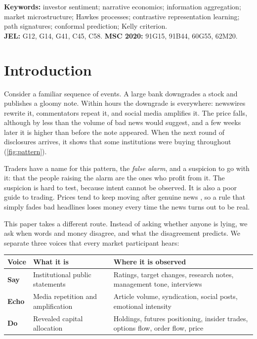 \documentclass[11pt,a4paper]{article}
\theoremstyle{plain}
\theoremstyle{definition}
\theoremstyle{remark}
\newcommand{\SAY}{\textcolor{say}{\textbf{Say}}}
\newcommand{\ECHO}{\textcolor{echo}{\textbf{Echo}}}
\newcommand{\DO}{\textcolor{do}{\textbf{Do}}}
\begin{document}
\noindent\textbf{Keywords:} investor sentiment; narrative economics; information aggregation; market microstructure; Hawkes processes; contrastive representation learning; path signatures; conformal prediction; Kelly criterion.\\
\textbf{JEL:} G12, G14, G41, C45, C58. \quad \textbf{MSC 2020:} 91G15, 91B44, 60G55, 62M20.

\tableofcontents
\newpage

\section{Introduction}\label{sec:intro}

Consider a familiar sequence of events. A large bank downgrades a stock and publishes a gloomy note. Within hours the downgrade is everywhere: newswires rewrite it, commentators repeat it, and social media amplifies it. The price falls, although by less than the volume of bad news would suggest, and a few weeks later it is higher than before the note appeared. When the next round of disclosures arrives, it shows that some institutions were buying throughout (\cref{fig:pattern}).

Traders have a name for this pattern, the \emph{false alarm}, and a suspicion to go with it: that the people raising the alarm are the ones who profit from it. The suspicion is hard to test, because intent cannot be observed. It is also a poor guide to trading. Prices tend to keep moving after genuine news \citep{chan2003}, so a rule that simply fades bad headlines loses money every time the news turns out to be real.

This paper takes a different route. Instead of asking whether anyone is lying, we ask when words and money disagree, and what the disagreement predicts. We separate three voices that every market participant hears:

\begin{center}
\small
\begin{tabular}{@{}>{\raggedright}p{1.6cm}>{\raggedright}p{4.6cm}>{\raggedright\arraybackslash}p{7.0cm}@{}}
\toprule
Voice & What it is & Where it is observed \\
\midrule
\SAY & Institutional public statements & Ratings, target changes, research notes, management tone, interviews \\
\ECHO & Media repetition and amplification & Article volume, syndication, social posts, emotional intensity \\
\DO & Revealed capital allocation & Holdings, futures positioning, insider trades, options flow, order flow, price \\
\bottomrule
\end{tabular}
\end{center}
\end{document}
